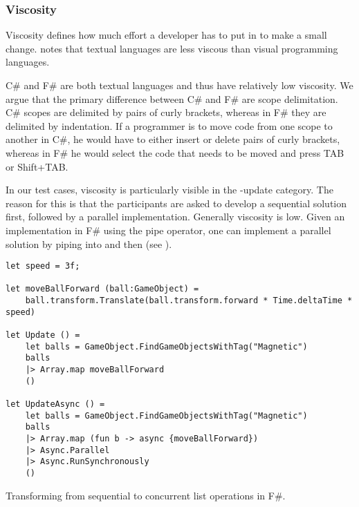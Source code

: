 \subsubsection{Viscosity}
Viscosity defines how much effort a developer has to put in to make a small change. \cite{green1996usability} notes that textual languages are less viscous than visual programming languages.

C\# and F\# are both textual languages and thus have relatively low viscosity. We argue that the primary difference between C\# and F\# are scope delimitation. C\# scopes are delimited by pairs of curly brackets, whereas in F\# they are delimited by indentation. If a programmer is to move code from one scope to another in C\#, he would have to either insert or delete pairs of curly brackets, whereas in F\# he would select the code that needs to be moved and press TAB or Shift+TAB.

In our test cases, viscosity is particularly visible in the -update category. The reason for this is that the participants are asked to develop a sequential solution first, followed by a parallel implementation. Generally viscosity is low. Given an implementation in F\# using the pipe operator, one can implement a parallel solution by piping into  and then  (see ).

\begin{listing}
    \begin{verbatim}
let speed = 3f;

let moveBallForward (ball:GameObject) =
    ball.transform.Translate(ball.transform.forward * Time.deltaTime * speed)

let Update () =
    let balls = GameObject.FindGameObjectsWithTag("Magnetic")
    balls
    |> Array.map moveBallForward
    ()

let UpdateAsync () =
    let balls = GameObject.FindGameObjectsWithTag("Magnetic")
    balls
    |> Array.map (fun b -> async {moveBallForward})
    |> Async.Parallel
    |> Async.RunSynchronously
    ()
    \end{verbatim}
    \caption{Transforming from sequential to concurrent list operations in F\#.}
    \label{lst:fsharp:pipe:async}
\end{listing}